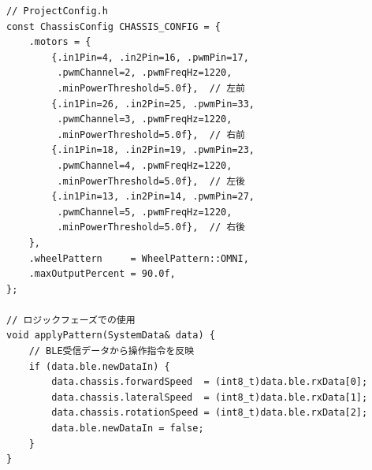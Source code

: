 \begin{lstlisting}[style=cppstyle, caption={ChassisModuleの使用例}]
// ProjectConfig.h
const ChassisConfig CHASSIS_CONFIG = {
    .motors = {
        {.in1Pin=4, .in2Pin=16, .pwmPin=17,
         .pwmChannel=2, .pwmFreqHz=1220,
         .minPowerThreshold=5.0f},  // 左前
        {.in1Pin=26, .in2Pin=25, .pwmPin=33,
         .pwmChannel=3, .pwmFreqHz=1220,
         .minPowerThreshold=5.0f},  // 右前
        {.in1Pin=18, .in2Pin=19, .pwmPin=23,
         .pwmChannel=4, .pwmFreqHz=1220,
         .minPowerThreshold=5.0f},  // 左後
        {.in1Pin=13, .in2Pin=14, .pwmPin=27,
         .pwmChannel=5, .pwmFreqHz=1220,
         .minPowerThreshold=5.0f},  // 右後
    },
    .wheelPattern     = WheelPattern::OMNI,
    .maxOutputPercent = 90.0f,
};

// ロジックフェーズでの使用
void applyPattern(SystemData& data) {
    // BLE受信データから操作指令を反映
    if (data.ble.newDataIn) {
        data.chassis.forwardSpeed  = (int8_t)data.ble.rxData[0];
        data.chassis.lateralSpeed  = (int8_t)data.ble.rxData[1];
        data.chassis.rotationSpeed = (int8_t)data.ble.rxData[2];
        data.ble.newDataIn = false;
    }
}
\end{lstlisting}

